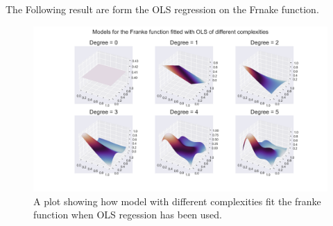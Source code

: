 \thispagestyle{plain}
The Following result are form the OLS regression on the Frnake function.

\begin{figure}
	\centering
	\includegraphics[width=\textwidth]{Figure_2.png}
	\caption{A plot showing how model with different complexities fit the franke function when OLS regession has been used.}
	\label{OLS figure}
\end{figure}

